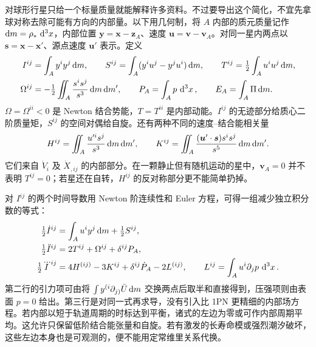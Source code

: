 对球形行星只给一个标量质量就能解释许多资料。不过要导出这个简化，不宜先拿球对称去除可能有方向的内部量。以下用几何制，将 $A$ 内部的质元质量记作 $\dd m=\rho_*\,\dd[3]{x}$，内部位置 $\bm y=\bm x-\bm z_A$、速度 $\bm u=\bm v-\bm v_A$。对同一星内两点以 $\bm s=\bm x-\bm x'$、源点速度 $\bm u'$ 表示。定义
\begin{align*}
 I^{ij}&=\int_A y^iy^j\,\dd m,\qquad
 S^{ij}=\int_A(y^i u^j-y^j u^i)\,\dd m,\qquad
 T^{ij}=\tfrac12\int_A u^i u^j\,\dd m,\\
 \Omega^{ij}&=-\tfrac12\iint_A \frac{s^is^j}{s^3}\,\dd m\,\dd m',\qquad
 P_A=\int_Ap\,\dd[3]{x},\qquad E_A=\int_A\Pi\,\dd m .
\end{align*}
$\Omega=\Omega^{ii}<0$ 是 Newton 结合势能，$T=T^{ii}$ 是内部动能。$I^{ij}$ 的无迹部分给质心二阶质量矩，$S^{ij}$ 的空间对偶给自旋。还有两种不同的速度--结合能相关量
\[
 H^{ij}=\iint_A \frac{u'^i s^j}{s^3}\,\dd m\,\dd m',\qquad
 K^{ij}=\iint_A\frac{(\bm u'\cdot\bm s)s^is^j}{s^5}\,\dd m\,\dd m' .
\]
它们来自 $\dot V_i$ 及 $\dot X_{,ij}$ 的内部部分。在一颗静止但有随机运动的星中，$\bm v_A=0$ 并不表明 $T^{ij}=0$；若星还在自转，$H^{ij}$ 的反对称部分更不能简单扔掉。

对 $I^{ij}$ 的两个时间导数用 Newton 阶连续性和 Euler 方程，可得一组减少独立积分数的等式：
\begin{align*}
 \tfrac12\dot I^{ij}&=\int_A u^iy^j\,\dd m+\tfrac12 S^{ij},\\
 \tfrac12\ddot I^{ij}&=2T^{ij}+\Omega^{ij}+\delta^{ij}P_A,\\
 \tfrac12\dddot I^{ij}&=4H^{(ij)}-3K^{ij}+\delta^{ij}\dot P_A-2L^{(ij)},\qquad
 L^{ij}=\int_A u^i\partial_jp\,\dd[3]{x}.
\end{align*}
第二行的引力项可由将 $\int y^{(i}\partial_{j)}\bar U\,\dd m$ 交换两点后取半和直接得到，压强项则由表面 $p=0$ 给出。第三行是对同一式再求导，没有引入比 1PN 更精细的内部场方程。若内部以短于轨道周期的时标达到平衡，诸式的左边为零或可作内部周期平均。这允许只保留低阶结合能张量和自旋。若有激发的长寿命模或强烈潮汐破坏，这些左边本身也是可观测的，便不能用定常维里关系代换。

